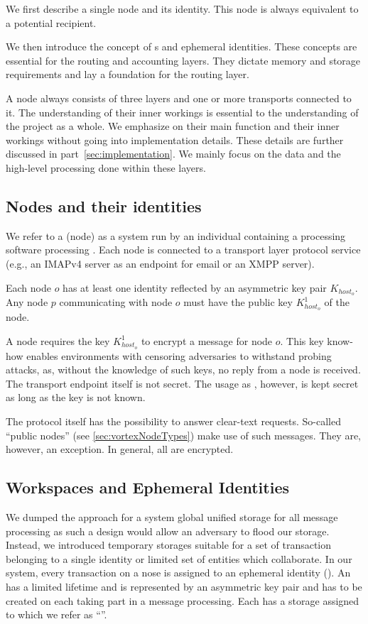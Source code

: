 We first describe a single node and its identity. This node is always equivalent to a potential recipient. 

We then introduce the concept of s and ephemeral identities. These concepts are essential for the routing and accounting layers. They dictate memory and storage requirements and lay a foundation for the routing layer.

A node always consists of three layers and one or more transports connected to it. The understanding of their inner workings is essential to the understanding of the project as a whole. We emphasize on their main function and their inner workings without going into implementation details. These details are further discussed in part~\ref{sec:implementation}. We mainly focus on the data and the high-level processing done within these layers.

\subsection{Nodes and their identities}
We refer to a \VortexNode{} (node) as a system run by an individual containing a processing software processing \VortexMessages. Each node is connected to a transport layer protocol service (e.g., an IMAPv4 server as an endpoint for email or an XMPP server). 

Each node $o$ has at least one identity reflected by an asymmetric key pair $K_{host_o}$. Any node $p$ communicating with node $o$ must have the public key  $K^1_{host_o}$ of the node.

A node requires the key $K^1_{host_o}$ to encrypt a message for node $o$. This key know-how enables environments with censoring adversaries to withstand probing attacks, as, without the knowledge of such keys, no reply from a node is received. The transport endpoint itself is not secret. The usage as \VortexNode, however, is kept secret as long as the key is not known.

The protocol itself has the possibility to answer clear-text requests. So-called ``public nodes'' (see \ref{sec:vortexNodeTypes}) make use of such messages. They are, however, an exception. In general, all \VortexMessages{} are encrypted.

\subsection{Workspaces and Ephemeral Identities}
We dumped the approach for a system global unified storage for all message processing as such a design would allow an adversary to flood our storage. Instead, we introduced temporary storages suitable for a set of transaction belonging to a single identity or limited set of entities which collaborate. In our system, every transaction on a nose is assigned to an ephemeral identity (). An  has a limited lifetime and is represented by an asymmetric key pair and has to be created on each \VortexNode{} taking part in a message processing. Each  has a storage assigned to which we refer as ``''.

